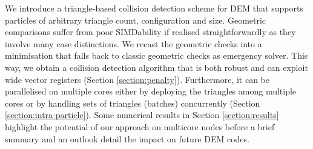 %
%
We introduce a triangle-based collision detection scheme for DEM that
supports particles of arbitrary triangle count, configuration and size.
Geometric comparisons suffer from poor SIMDability if realised
straightforwardly as they involve many case distinctions.
We recast the geometric checks into a minimisation that falls back to
classic geometric checks as emergency solver.
This way, we obtain a collision detection algorithm that is both robust and can
exploit wide vector registers (Section \ref{section:penalty}).
Furthermore, it can be parallelised on multiple cores either by deploying the
triangles among multiple cores or by handling sets of triangles (batches)
concurrently (Section \ref{section:intra-particle}).
Some numerical results in Section \ref{section:results} highlight the potential
of our approach on multicore nodes before a brief summary and an outlook
detail the impact on future DEM codes.